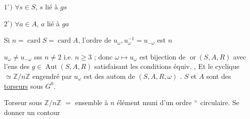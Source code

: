 $1^{\circ})$ $\forall s\in S$, $s$ lié à $gs$

$2^{\circ})$ $\forall a\in A$, $a$ lié à $ga$

Si $n=\operatorname{card}S=\operatorname{card}A$, l'ordre de $u_{\omega},u_{\omega}^{-1}=u_{-\omega}$ est $n$

 $u_{\omega}\ne u_{-\omega}$ sss $n\ne2$ i.e. $n\geq3$ ; donc $\omega\longmapsto u_{\omega}$ est bijection de $\operatorname{or}(S,A,R)$ avec l'ens des $g\in\operatorname{Aut}(S,A,R)$ satisfaisant les conditions équiv. , Et le  cyclique $\simeq\mathbb{Z}/n\mathbb{Z}$ engendré par $u_{\omega}$ est    des autom  de $(S,A,R,\omega)$ . $S$ et $A$ sont des \uline{torseurs} sous $G^{0}$.


Torseur sous $\mathbb{Z}/n\mathbb{Z}$  $=$ ensemble  à $n$ élément muni d'un ordre $^{\times}$ circulaire. Se donner un contour
